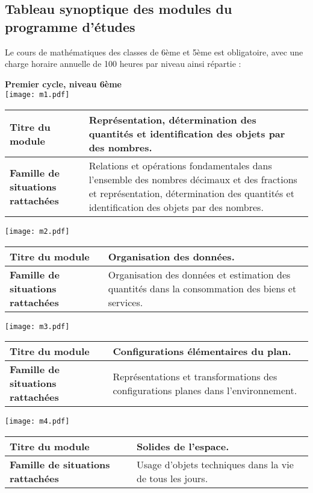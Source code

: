 \subsection*{Tableau synoptique des modules du programme d'études}

Le cours de mathématiques des classes de 6ème et 5ème est obligatoire, avec une charge horaire annuelle de 100 heures par niveau ainsi répartie :

\textbf{Premier cycle, niveau 6ème}\\

\texttt{[image: m1.pdf]} 

\begin{tabular}{>{\raggedleft\arraybackslash}p{4cm}p{9cm}}
\textbf{Titre du module} & Représentation, détermination des quantités et identification des objets par des nombres.\\\midrule
\textbf{Famille de situations rattachées} & Relations et opérations fondamentales dans l'ensemble des nombres décimaux et des fractions et représentation, détermination des quantités et identification des objets par des nombres.
\end{tabular}

\texttt{[image: m2.pdf]} 

\begin{tabular}{>{\raggedleft\arraybackslash}p{4cm}p{9cm}}
\textbf{Titre du module} &Organisation des données.\\\midrule
\textbf{Famille de situations rattachées} &Organisation des données et estimation des quantités dans la consommation des biens et services.
\end{tabular}

\texttt{[image: m3.pdf]} 

\begin{tabular}{>{\raggedleft\arraybackslash}p{4cm}p{9cm}}
\textbf{Titre du module} & Configurations élémentaires du plan.\\\midrule
\textbf{Famille de situations rattachées} & Représentations et transformations des configurations planes dans l'environnement.
\end{tabular}

\texttt{[image: m4.pdf]} 

\begin{tabular}{>{\raggedleft\arraybackslash}p{4cm}p{9cm}}
\textbf{Titre du module} & Solides de l'espace.\\\midrule
\textbf{Famille de situations rattachées} & Usage d'objets techniques dans la vie de tous les jours.
\end{tabular}

